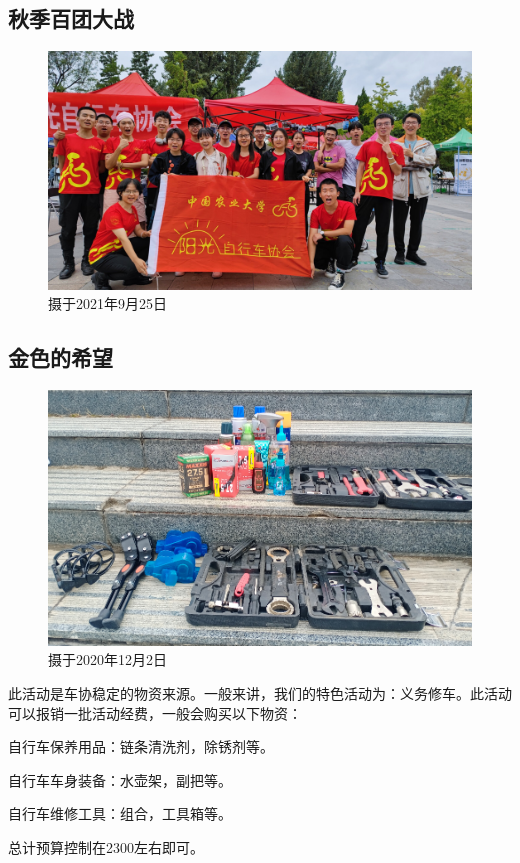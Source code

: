 \documentclass{ctexbook}
\begin{document}
\subsection{秋季百团大战}
\begin{figure}[htp]
    \centering
    \includegraphics[width=0.7\linewidth]{fig/百团大战}
    \caption{摄于2021年9月25日}
    \label{fig:}
\end{figure}

\subsection{金色的希望}
\begin{figure}[htp]
    \centering
    \includegraphics[width=0.7\linewidth]{fig/金色的希望}
    \caption{摄于2020年12月2日}
    \label{fig:}
\end{figure}

此活动是车协稳定的物资来源。一般来讲，我们的特色活动为：义务修车。此活动可以报销一批活动经费，一般会购买以下物资：

自行车保养用品：链条清洗剂，除锈剂等。

自行车车身装备：水壶架，副把等。

自行车维修工具：组合，工具箱等。

总计预算控制在2300左右即可。
\end{document}
